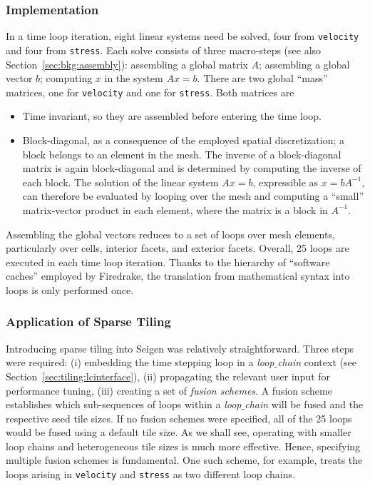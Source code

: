 \subsubsection{Implementation}
In a time loop iteration, eight linear systems need be solved, four from {\tt velocity} and four from {\tt stress}. Each solve consists of three macro-steps (see also Section~\ref{sec:bkg:assembly}): assembling a global matrix $A$; assembling a global vector $b$; computing $x$ in the system $Ax = b$. There are two global ``mass'' matrices, one for {\tt velocity} and one for {\tt stress}. Both matrices are
\begin{itemize}
\item Time invariant, so they are assembled before entering the time loop.
\item Block-diagonal, as a consequence of the employed spatial discretization; a block belongs to an element in the mesh. The inverse of a block-diagonal matrix is again block-diagonal and is determined by computing the inverse of each block. The solution of the linear system $Ax = b$, expressible as $x = b A^{-1}$, can therefore be evaluated by looping over the mesh and computing a ``small'' matrix-vector product in each element, where the matrix is a block in $A^{-1}$.
\end{itemize}
Assembling the global vectors reduces to a set of loops over mesh elements, particularly over cells, interior facets, and exterior facets. Overall, 25 loops are executed in each time loop iteration. Thanks to the hierarchy of ``software caches'' employed by Firedrake, the translation from mathematical syntax into loops is only performed once. 


\subsubsection{Application of Sparse Tiling}
Introducing sparse tiling into Seigen was relatively straightforward. Three steps were required: (i) embedding the time stepping loop in a {\em loop$\_$chain} context (see Section~\ref{sec:tiling:lcinterface}), (ii) propagating the relevant user input for performance tuning, (iii) creating a set of {\em fusion schemes}. A fusion scheme establishes which sub-sequences of loops within a {\em loop$\_$chain} will be fused and the respective seed tile sizes. If no fusion schemes were specified, all of the 25 loops would be fused using a default tile size. As we shall see, operating with smaller loop chains and heterogeneous tile sizes is much more effective. Hence, specifying multiple fusion schemes is fundamental. One such scheme, for example, treats the loops arising in {\tt velocity} and {\tt stress} as two different loop chains. 

